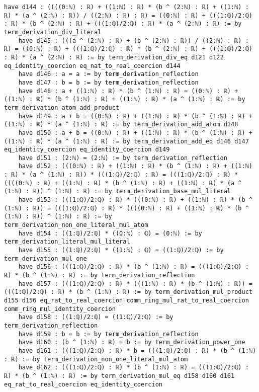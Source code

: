 \documentclass{article}
\begin{document}
\begin{tcolorbox}[colback=white!10, width=\linewidth]
\begin{lstlisting}[language=Lean4]
    have d144 : ((((0:ℕ) : ℝ) + ((1:ℕ) : ℝ) * (b ^ (2:ℕ) : ℝ) + ((1:ℕ) : ℝ) * (a ^ (2:ℕ) : ℝ)) / ((2:ℕ) : ℝ) : ℝ) = ((0:ℕ) : ℝ) + (((1:ℚ)/2:ℚ) : ℝ) * (b ^ (2:ℕ) : ℝ) + (((1:ℚ)/2:ℚ) : ℝ) * (a ^ (2:ℕ) : ℝ) := by term_derivation_div_literal
    have d145 : (((a ^ (2:ℕ) : ℝ) + (b ^ (2:ℕ) : ℝ)) / ((2:ℕ) : ℝ) : ℝ) = ((0:ℕ) : ℝ) + (((1:ℚ)/2:ℚ) : ℝ) * (b ^ (2:ℕ) : ℝ) + (((1:ℚ)/2:ℚ) : ℝ) * (a ^ (2:ℕ) : ℝ) := by term_derivation_div_eq d121 d122 eq_identity_coercion eq_nat_to_real_coercion d144
    have d146 : a = a := by term_derivation_reflection
    have d147 : b = b := by term_derivation_reflection
    have d148 : a + ((1:ℕ) : ℝ) * (b ^ (1:ℕ) : ℝ) = ((0:ℕ) : ℝ) + ((1:ℕ) : ℝ) * (b ^ (1:ℕ) : ℝ) + ((1:ℕ) : ℝ) * (a ^ (1:ℕ) : ℝ) := by term_derivation_atom_add_product
    have d149 : a + b = ((0:ℕ) : ℝ) + ((1:ℕ) : ℝ) * (b ^ (1:ℕ) : ℝ) + ((1:ℕ) : ℝ) * (a ^ (1:ℕ) : ℝ) := by term_derivation_add_atom d148
    have d150 : a + b = ((0:ℕ) : ℝ) + ((1:ℕ) : ℝ) * (b ^ (1:ℕ) : ℝ) + ((1:ℕ) : ℝ) * (a ^ (1:ℕ) : ℝ) := by term_derivation_add_eq d146 d147 eq_identity_coercion eq_identity_coercion d149
    have d151 : (2:ℕ) = (2:ℕ) := by term_derivation_reflection
    have d152 : (((0:ℕ) : ℝ) + ((1:ℕ) : ℝ) * (b ^ (1:ℕ) : ℝ) + ((1:ℕ) : ℝ) * (a ^ (1:ℕ) : ℝ)) * (((1:ℚ)/2:ℚ) : ℝ) = (((1:ℚ)/2:ℚ) : ℝ) * ((((0:ℕ) : ℝ) + ((1:ℕ) : ℝ) * (b ^ (1:ℕ) : ℝ) + ((1:ℕ) : ℝ) * (a ^ (1:ℕ) : ℝ)) ^ (1:ℕ) : ℝ) := by term_derivation_base_mul_literal
    have d153 : (((1:ℚ)/2:ℚ) : ℝ) * (((0:ℕ) : ℝ) + ((1:ℕ) : ℝ) * (b ^ (1:ℕ) : ℝ)) = (((1:ℚ)/2:ℚ) : ℝ) * ((((0:ℕ) : ℝ) + ((1:ℕ) : ℝ) * (b ^ (1:ℕ) : ℝ)) ^ (1:ℕ) : ℝ) := by term_derivation_non_one_literal_mul_atom
    have d154 : ((1:ℚ)/2:ℚ) * ((0:ℕ) : ℚ) = (0:ℕ) := by term_derivation_literal_mul_literal
    have d155 : ((1:ℚ)/2:ℚ) * ((1:ℕ) : ℚ) = ((1:ℚ)/2:ℚ) := by term_derivation_mul_one
    have d156 : (((1:ℚ)/2:ℚ) : ℝ) * (b ^ (1:ℕ) : ℝ) = (((1:ℚ)/2:ℚ) : ℝ) * (b ^ (1:ℕ) : ℝ) := by term_derivation_reflection
    have d157 : (((1:ℚ)/2:ℚ) : ℝ) * (((1:ℕ) : ℝ) * (b ^ (1:ℕ) : ℝ)) = (((1:ℚ)/2:ℚ) : ℝ) * (b ^ (1:ℕ) : ℝ) := by term_derivation_mul_product d155 d156 eq_rat_to_real_coercion comm_ring_mul_rat_to_real_coercion comm_ring_mul_identity_coercion
    have d158 : ((1:ℚ)/2:ℚ) = ((1:ℚ)/2:ℚ) := by term_derivation_reflection
    have d159 : b = b := by term_derivation_reflection
    have d160 : (b ^ (1:ℕ) : ℝ) = b := by term_derivation_power_one
    have d161 : (((1:ℚ)/2:ℚ) : ℝ) * b = (((1:ℚ)/2:ℚ) : ℝ) * (b ^ (1:ℕ) : ℝ) := by term_derivation_non_one_literal_mul_atom
    have d162 : (((1:ℚ)/2:ℚ) : ℝ) * (b ^ (1:ℕ) : ℝ) = (((1:ℚ)/2:ℚ) : ℝ) * (b ^ (1:ℕ) : ℝ) := by term_derivation_mul_eq d158 d160 d161 eq_rat_to_real_coercion eq_identity_coercion

\end{lstlisting}
\end{tcolorbox}
\end{document}
